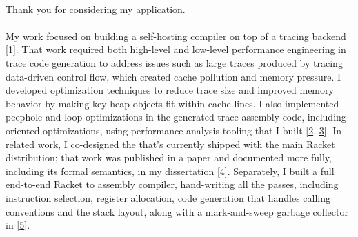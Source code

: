 

\newcommand{\dissertationurl}{https://github.com/cderici/dissertation/releases/download/latest-pdf/thesis.pdf}
\newcommand{\pycketperfurl}{https://github.com/cderici/pycket-performance}
\newcommand{\tracedrawurl}{https://github.com/cderici/trace-draw}
\newcommand{\raxurl}{https://github.com/cderici/rax}
\newcommand{\icfpreporturl}{https://dl.acm.org/doi/10.1145/3341642}
\newcommand{\atwurl}{https://github.com/cderici/around-the-world-in-26-languages}
\newcommand{\homelaburl}{https://home.dericilab.live/homelab/}

\newcommand{\cairolang}{https://github.com/cderici/around-the-world-in-compilers/blob/main/langs/cairo/README.md}
\newcommand{\dublinlang}{https://github.com/cderici/around-the-world-in-compilers/blob/main/langs/dublin/README.md}
\newcommand{\edinlang}{https://github.com/cderici/around-the-world-in-compilers/blob/main/langs/edinburgh/README.md}





\paragraph{} %
Thank you for considering my application.

\paragraph{} %
My  work focused on building a self-hosting compiler on top of a tracing  backend [\href{\dissertationurl}{1}]. That work required both high-level and low-level performance engineering in trace code generation to address issues such as large traces produced by tracing data-driven control flow, which created cache pollution and memory pressure. I developed optimization techniques to reduce trace size and improved memory behavior by making key heap objects fit within  cache lines. I also implemented peephole and loop optimizations in the generated trace assembly code, including -oriented optimizations, using performance analysis tooling that I built [\href{\pycketperfurl}{2}, \href{\tracedrawurl}{3}]. In related work, I co-designed the  that's currently shipped with the main Racket distribution; that work was published in a paper and documented more fully, including its formal semantics, in my dissertation [\href{\icfpreporturl}{4}]. Separately, I built a full end-to-end Racket to  assembly compiler, hand-writing all the passes, including instruction selection, register allocation, code generation that handles calling conventions and the stack layout, along with a mark-and-sweep garbage collector in  [\href{\raxurl}{5}].

